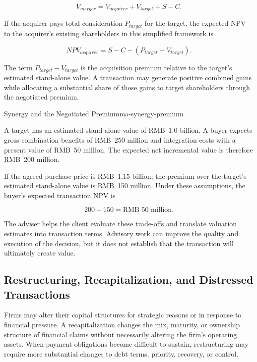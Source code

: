 \begin{equation}
V_{merger}=V_{acquirer}+V_{target}+S-C.
\label{eq:ch13-combined-transaction-value}
\end{equation}

If the acquirer pays total consideration $P_{target}$ for the target, the expected NPV to the acquirer's existing shareholders in this simplified framework is

\begin{equation}
\textit{NPV}_{acquirer}=S-C-(P_{target}-V_{target}).
\label{eq:ch13-acquirer-transaction-npv}
\end{equation}

The term $P_{target}-V_{target}$ is the acquisition premium relative to the target's estimated stand-alone value. A transaction may generate positive combined gains while allocating a substantial share of those gains to target shareholders through the negotiated premium.

\begin{example}{Synergy and the Negotiated Premium}{ma-synergy-premium}

A target has an estimated stand-alone value of RMB~1.0 billion. A buyer expects gross combination benefits of RMB~250 million and integration costs with a present value of RMB~50 million. The expected net incremental value is therefore RMB~200 million.

If the agreed purchase price is RMB~1.15 billion, the premium over the target's estimated stand-alone value is RMB~150 million. Under these assumptions, the buyer's expected transaction NPV is

\[
200-150=\text{RMB }50\text{ million}.
\]

\end{example}

The adviser helps the client evaluate these trade-offs and translate valuation estimates into transaction terms. Advisory work can improve the quality and execution of the decision, but it does not establish that the transaction will ultimately create value.

\subsection{Restructuring, Recapitalization, and Distressed Transactions}

Firms may alter their capital structures for strategic reasons or in response to financial pressure. A recapitalization changes the mix, maturity, or ownership structure of financial claims without necessarily altering the firm's operating assets. When payment obligations become difficult to sustain, restructuring may require more substantial changes to debt terms, priority, recovery, or control.

